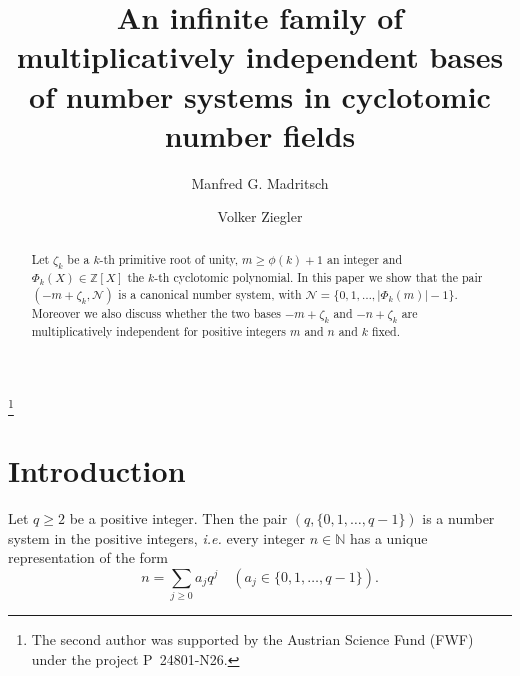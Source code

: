 \documentclass{amsart}
\theoremstyle{plain}
\numberwithin{equation}{section}
\theoremstyle{remark}
\begin{document}
\title[Infinite family of bases]
{An infinite family of multiplicatively independent bases of number systems in cyclotomic number fields}

\author[M. G. Madritsch]{Manfred G. Madritsch}
\address{Manfred Madritsch\newline
{}. Universit\'e de Lorraine, Institut Elie Cartan de Lorraine, UMR 7502, Vandoeuvre-l\`es-Nancy, F-54506, France;\newline
{}. CNRS, Institut Elie Cartan de Lorraine, UMR 7502, Vandoeuvre-l\`es-Nancy, F-54506, France}

\author{Volker Ziegler}
\address{Volker Ziegler\newline
\noindent Johann Radon Institute for Computational and Applied Mathematics (RICAM)\newline
\noindent Austrian Academy of Sciences\newline
\noindent Altenbergerstr. 69\newline
\noindent A-4040 Linz, Austria}
\thanks{The second author was supported by the Austrian Science Fund (FWF) under the project P~24801-N26.}

\begin{abstract}
  Let $\zeta_k$ be a $k$-th primitive root of unity, $m\geq\phi(k)+1$ an
  integer and $\Phi_k(X)\in{{\mathbb Z}}[X]$ the $k$-th cyclotomic polynomial.
  In this paper we show that the pair $(-m+\zeta_k,\mathcal N)$ is a
  canonical number system, with $\mathcal
  N=\{0,1,\dots,|\Phi_k(m)|-1\}$.  Moreover we also discuss whether the
  two bases $-m+\zeta_k$ and $-n+\zeta_k$ are multiplicatively
  independent for positive integers $m$ and $n$ and $k$ fixed.
\end{abstract}

 

\maketitle

\section{Introduction}
Let $q\geq2$ be a positive integer. Then the pair
$(q,\{0,1,\ldots,q-1\})$ is a number system in the positive integers,
\textit{i.e.} every integer $n\in{{\mathbb N}}$ has a unique representation of
the form
$$n=\sum_{j\geq0}a_jq^j\quad(a_j\in\{0,1,\ldots,q-1\}).$$
\end{document}
